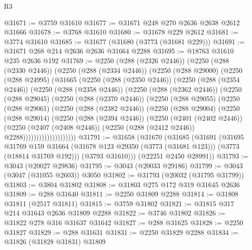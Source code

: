 \begin{lexlean}{R3}
\begin{coremodule}
@31671 := @3759 @31610
@31677 := @31671 @248 @270 @2636 @2638 @2612 @31666
@31678 := @3768 @31610
@31680 := @31678 @229 @2612
@31681 := @3774 @31610
@31685 := @31677 (@31680 (@3773 (@31681 @229)))
@31691 := @31671 @268 @214 @2636 @2636 @31664 @2288
@31695 := @18763 @31610 @235 @2636 @192
@31769 := @2250
    (@288 (@2326 @2446))
    (@2250
      (@288 (@2330 @2446))
      (@2250
        (@288 (@2334 @2446))
        (@2250
          (@288 @29000)
          (@2250
            (@288 @24995)
            (@31665
              (@2250
                (@288 (@2350 @2446))
                (@2250
                  (@288 (@2354 @2446))
                  (@2250
                    (@288 (@2358 @2446))
                    (@2250
                      (@288 (@2362 @2446))
                      (@2250
                        (@288 @29045)
                        (@2250
                          (@288 (@2370 @2446))
                          (@2250
                            (@288 @29055)
                            (@2250
                              (@288 @29061)
                              (@2250
                                (@288 (@2382 @2446))
                                (@2250
                                  (@288 @29004)
                                  (@2250
                                    (@288 @29014)
                                    (@2250
                                      (@288 (@2394 @2446))
                                      (@2250
                                        (@2401 (@2402 @2446))
                                        (@2250
                                          (@2407 (@2408 @2446))
                                          (@2250 (@288 (@2412 @2446)) @2288))))))))))))))))))))
@31791 := @31658
    (@31670
      (@31685
        (@31691
          (@31695
            @31769
            @159
            @31664
            (@31678 @123 @29350 (@3773 (@31681 @123)))
            (@3773 (@18814 @31769 @192)))
          (@3793 @31610)))
      (@22251 @2450 @28991))
@31793 := @3043 (@20027 @29836)
@31795 := @3043 (@20033 @29186)
@31799 := @3043 (@3047 (@31055 @2603)) @3050
@31802 := @31793 (@20032 (@31795 @31799))
@31803 := @3804 @31802
@31808 := @31803 @275 @172 @319 @31645 @2636
@31809 := @288 @31640
@31811 := @2250 @31809 @2288
@31814 := @31808 @31811 (@2517 @31811)
@31815 := @3759 @31802
@31821 := @31815 @317 @214 @31643 @2636 @31809 @2288
@31822 := @3746 @31802
@31826 := @31822 @278 @316 @31637 @31642
@31827 := @288 @31625
@31828 := @2250 @31827
@31829 := @288 @31631
@31831 := @2250 @31829 @2288
@31834 := @31826 (@31828 @31831) @31809

\end{coremodule}
\end{lexlean}
